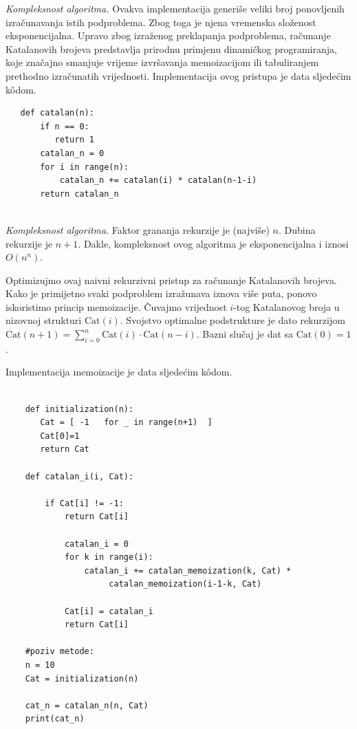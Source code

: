\textit{Kompleksnost algoritma.} Ovakva implementacija generiše veliki broj ponovljenih izračunavanja istih podproblema. Zbog toga je njena vremenska složenost eksponencijalna. Upravo zbog izraženog preklapanja podproblema, računanje Katalanovih brojeva predstavlja prirodnu primjenu dinamičkog programiranja, koje značajno smanjuje vrijeme izvršavanja memoizacijom ili tabuliranjem prethodno izračunatih vrijednosti.
 Implementacija ovog pristupa je data sljedećim k\^odom. 
 
 \begin{verbatim}
   def catalan(n):
       if n == 0:
          return 1
       catalan_n = 0 
       for i in range(n): 
           catalan_n += catalan(i) * catalan(n-1-i) 
       return catalan_n
        
 \end{verbatim}
  
  \emph{Kompleksnost algoritma}. Faktor grananja rekurzije je (najviše) $n$. Dubi\-na rekurzije je $n+1$. Dakle, kompleksnost ovog algoritma je eksponencijalna i iznosi $O(n^n)$. 

Optimizujmo ovaj naivni rekurzivni pristup za računanje Katalanovih brojeva. Kako je primijetno svaki podproblem izražunava iznova više puta, ponovo iskoristimo princip memoizacije. Čuvajmo vrijednost $i$-tog Katalano\-vog broja u nizovnoj strukturi $\textrm{Cat}(i)$.  Svojstvo optimalne podstrukture je dato rekurzijom $\textrm{Cat}(n+1) = \sum_{i=0}^{n} \textrm{Cat}(i) \cdot \textrm{Cat}(n-i).$ Bazni slučaj je dat sa $\textrm{Cat}(0) =1$.

Implementacija memoizacije je data sljedećim k\^odom.

  \begin{verbatim}
	
	def initialization(n):
	   Cat = [ -1   for _ in range(n+1)  ] 
	   Cat[0]=1
	   return Cat 
	
	def catalan_i(i, Cat): 
	
	    if Cat[i] != -1:
	        return Cat[i]
     
            catalan_i = 0
            for k in range(i): 
                catalan_i += catalan_memoization(k, Cat) *
                     catalan_memoization(i-1-k, Cat)
    
            Cat[i] = catalan_i
            return Cat[i]
    
	#poziv metode:
	n = 10
	Cat = initialization(n) 
	
	cat_n = catalan_n(n, Cat) 
	print(cat_n)
\end{verbatim}  

